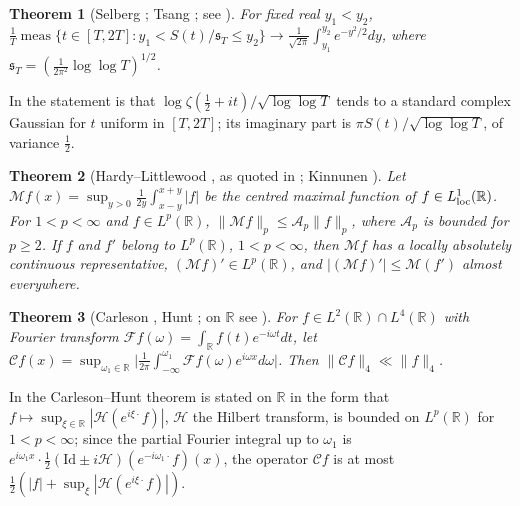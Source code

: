 \documentclass[preprint,12pt]{elsarticle}
\numberwithin{equation}{section}
\theoremstyle{plain}
\newtheorem{theorem}{Theorem}[section]
\theoremstyle{definition}
\theoremstyle{remark}
\newcommand{\R}{\mathbb R}
\begin{document}
\begin{theorem}[Selberg {\cite{Selberg1946a}}; Tsang {\cite{Tsang1984}}; see {\cite[(1.1)]{FazzariGerspachMinelli2025}}]\label{thm:known_selberg_clt}
For fixed real $y_1<y_2$, $\frac1T\operatorname{meas}\{t\in[T,2T]:y_1<S(t)/\mathfrak s_T\le y_2\}\to\frac1{\sqrt{2\pi}}\int_{y_1}^{y_2}e^{-y^2/2}dy$, where $\mathfrak s_T=(\frac1{2\pi^2}\log\log T)^{1/2}$.
\end{theorem}
In \cite{FazzariGerspachMinelli2025} the statement is that $\log\zeta(\frac12+it)/\sqrt{\log\log T}$ tends to a standard complex Gaussian for $t$ uniform in $[T,2T]$; its imaginary part is $\pi S(t)/\sqrt{\log\log T}$, of variance $\frac12$.

\begin{theorem}[Hardy--Littlewood {\cite[Thm.~I.1]{Stein1970}}, as quoted in {\cite[(1.2)]{Kinnunen1997}}; Kinnunen {\cite[Thm.~1.4]{Kinnunen1997}}]\label{thm:known_maximal}
Let $\mathcal Mf(x)=\sup_{y>0}\frac1{2y}\int_{x-y}^{x+y}|f|$ be the centred maximal function of $f\in L^1_{\rm loc}(\R)$. For $1<p<\infty$ and $f\in L^p(\R)$, $\|\mathcal Mf\|_p\le\mathcal A_p\|f\|_p$, where $\mathcal A_p$ is bounded for $p\ge2$. If $f$ and $f'$ belong to $L^p(\R)$, $1<p<\infty$, then $\mathcal Mf$ has a locally absolutely continuous representative, $(\mathcal Mf)'\in L^p(\R)$, and $|(\mathcal Mf)'|\le\mathcal M(f')$ almost everywhere.
\end{theorem}

\begin{theorem}[Carleson {\cite{Carleson1966}}, Hunt {\cite{Hunt1968}}; on $\R$ see {\cite[(1.1) and p.~1]{DiPlinioLerner2014}}]\label{thm:known_carleson}
For $f\in L^2(\R)\cap L^4(\R)$ with Fourier transform $\mathcal Ff(\omega)=\int_\R f(t)e^{-i\omega t}dt$, let $\mathcal Cf(x)=\sup_{\omega_1\in\R}\bigl|\frac1{2\pi}\int_{-\infty}^{\omega_1}\mathcal Ff(\omega)e^{i\omega x}d\omega\bigr|$. Then $\|\mathcal Cf\|_4\ll\|f\|_4$.
\end{theorem}
In \cite[p.~1]{DiPlinioLerner2014} the Carleson--Hunt theorem is stated on $\R$ in the form that $f\mapsto\sup_{\xi\in\R}|\mathcal H(e^{i\xi\cdot}f)|$, $\mathcal H$ the Hilbert transform, is bounded on $L^p(\R)$ for $1<p<\infty$; since the partial Fourier integral up to $\omega_1$ is $e^{i\omega_1x}\cdot\frac12(\mathrm{Id}\pm i\mathcal H)(e^{-i\omega_1\cdot}f)(x)$, the operator $\mathcal Cf$ is at most $\frac12(|f|+\sup_\xi|\mathcal H(e^{i\xi\cdot}f)|)$.
\end{document}
